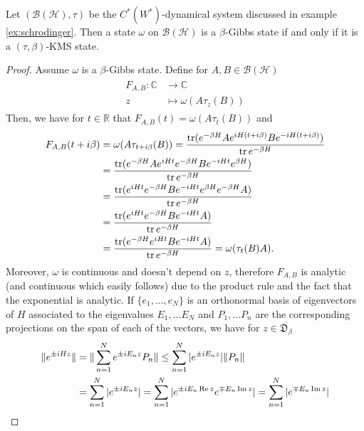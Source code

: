 \begin{theorem}
Let $(\mathcal{B}(\mathcal{H}),\tau)$ be the $C^*(W^*)$-dynamical system discussed in example \ref{ex:schrodinger}. Then a state $\omega$ on $\mathcal{B}(\mathcal{H})$ is a $\beta$-Gibbs state if and only if it is a $(\tau,\beta)$-KMS state.  
\end{theorem}

\begin{proof}
Assume $\omega$ is a $\beta$-Gibbs state. Define for $A,B\in\mathcal{B}(\mathcal{H})$
\begin{align}
\begin{split}
F_{A,B}:\mathbb{C}&\rightarrow\mathbb{C} \\
z&\mapsto \omega(A\tau_z(B))
\end{split}
\end{align}
Then, we have for $t\in\mathbb{R}$ that $F_{A,B}(t)=\omega(A\tau_t(B))$ and 
\begin{align}
\begin{split}
F_{A,B}(t+i\beta)& =\omega(A\tau_{t+i\beta}(B))=\frac{\operatorname{tr}(e^{-\beta H}Ae^{iH(t+i\beta)}Be^{-iH(t+i\beta)})}{\operatorname{tr} e^{-\beta H}} \\
&= \frac{\operatorname{tr}(e^{-\beta H}Ae^{iHt}e^{-\beta H}Be^{-iHt}e^{\beta H})}{\operatorname{tr} e^{-\beta H}} \\
&= \frac{\operatorname{tr}(e^{iHt}e^{-\beta H}Be^{-iHt}e^{\beta H}e^{-\beta H}A)}{\operatorname{tr} e^{-\beta H}} \\
&= \frac{\operatorname{tr}(e^{iHt}e^{-\beta H}Be^{-iHt}A)}{\operatorname{tr} e^{-\beta H}} \\
&= \frac{\operatorname{tr}(e^{-\beta H}e^{iHt}Be^{-iHt}A)}{\operatorname{tr} e^{-\beta H}} = \omega(\tau_t(B)A).
\end{split} 
\end{align}
Moreover, $\omega$ is continuous and doesn't depend on $z$, therefore $F_{A,B}$ is analytic (and continuous which easily follows) due to the product rule and the fact that the exponential is analytic. 
If $\{e_1,\dots,e_N\}$ is an orthonormal basis of eigenvectors of $H$ associated to the eigenvalues $E_1,\dots E_N$ and $P_1,\dots P_n$ are the corresponding projections on the span of each of the vectors, we have for $z\in \overline{\mathfrak{D}_\beta}$
\begin{align}
\begin{split}
\|e^{\pm iHz}\|&=\|\sum_{n=1}^N e^{\pm iE_n z}P_n\|\leq\sum_{n=1}^N |e^{\pm iE_n z}|\|P_n\| \\
&=\sum_{n=1}^N |e^{\pm iE_n z}|=\sum_{n=1}^N |e^{\pm iE_n \re z}e^{\mp E_n \im z}|=\sum_{n=1}^N |e^{\mp E_n \im z}| \\

\end{split}
\end{align}
\end{proof}
